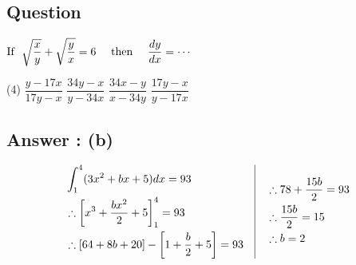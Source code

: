 \documentclass[17pt]{extarticle}
\begin{document}
\begin{fleqn}
\section{Question} 

$\begin{aligned}[t] 
\text{If \ } \sqrt{\frac{x}{y}} + \sqrt{\frac{y}{x}} = 6 \text{ \quad then \quad } \frac{dy}{dx} = \cdots
\end{aligned}$

\begin{tasks}(4)
  \task $\dfrac{y-17x}{17y-x}$ 
  \task $\dfrac{34y-x}{y-34x}$ 
  \task $\dfrac{34x-y}{x-34y}$ 
  \task $\dfrac{17y-x}{y-17x}$ 
\end{tasks}
\subsection*{Answer : (b)}
\begin{equation} \nonumber
\begin{alignedat}{4}
& \int_{1}^{4} (3x^2 + bx + 5) dx = 93\\
& \therefore \left[ x^3 +\frac{bx^2}{2}+5\right]_{1}^{4} = 93\\
& \therefore [64+8b+20] - \left[ 1 + \frac{b}{2} + 5\right]=93\\
\end{alignedat}
\quad
\vrule
\quad
\begin{alignedat}{4}
& \therefore 78+\frac{15b}{2} = 93\\
& \therefore \frac{15b}{2} = 15\\
& \therefore b=2\\
\end{alignedat}
\end{equation}


\end{fleqn}
\end{document}
